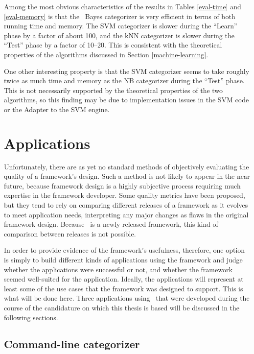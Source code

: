 Among the most obvious characteristics of the results in Tables
\ref{eval-time} and \ref{eval-memory} is that the \naive\ Bayes
categorizer is very efficient in terms of both running time and
memory.  The SVM categorizer is slower during the ``Learn'' phase by a
factor of about 100, and the kNN categorizer is slower during the
``Test'' phase by a factor of 10--20.  This is consistent with the
theoretical properties of the algorithms discussed in Section
\ref{machine-learning}.

One other interesting property is that the SVM categorizer seems to
take roughly twice as much time and memory as the NB categorizer
during the ``Test'' phase.  This is not necessarily supported by the
theoretical properties of the two algorithms, so this finding may be
due to implementation issues in the SVM code or the Adapter to the SVM
engine.


\section{Applications}
\label{Applications}

Unfortunately, there are as yet no standard methods of objectively
evaluating the quality of a framework's design.  Such a method is not
likely to appear in the near future, because framework design is a
highly subjective process requiring much expertise in the framework
developer. \cite[sec. 1.5]{fayad:99} Some quality metrics have been
proposed, but they tend to rely on comparing different releases of a
framework as it evolves to meet application needs, interpreting any
major changes as flaws in the original framework
design. \cite[ch. 25]{fayad:99} Because \aicat\ is a newly released
framework, this kind of comparison between releases is not possible.

In order to provide evidence of the framework's usefulness, therefore,
one option is simply to build different kinds of applications using
the framework and judge whether the applications were successful or
not, and whether the framework seemed well-suited for the application.
Ideally, the applications will represent at least some of the use
cases that the framework was designed to support.  This is what will
be done here.  Three applications using \aicat\ that were developed
during the course of the candidature on which this thesis is based
will be discussed in the following sections.

\subsection{Command-line categorizer}

